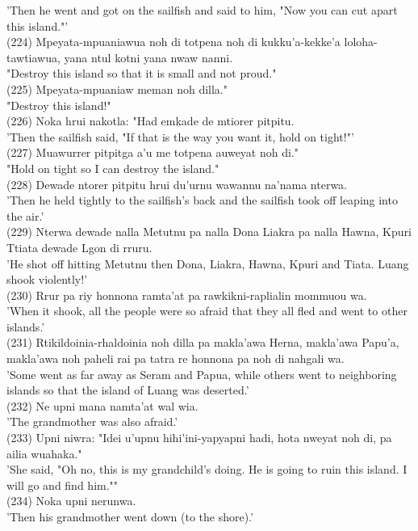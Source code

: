 \documentclass[10pt]{article}
\begin{document}
'Then he went and got on the sailfish and said to him, "Now you can cut apart this island."'\\
(224) Mpeyata-mpuaniawua noh di totpena noh di kukku'a-kekke'a loloha-tawtiawua, yana ntul kotni yana nwaw nanni.\\
"Destroy this island so that it is small and not proud."\\
(225) Mpeyata-mpuaniaw meman noh dilla."\\
"Destroy this island!"\\
(226) Noka hrui nakotla: "Had emkade de mtiorer pitpitu.\\
'Then the sailfish said, "If that is the way you want it, hold on tight!"'\\
(227) Muawurrer pitpitga a'u me totpena auweyat noh di."\\
"Hold on tight so I can destroy the island."\\
(228) Dewade ntorer pitpitu hrui du'urnu wawannu na'nama nterwa.\\
'Then he held tightly to the sailfish's back and the sailfish took off leaping into the air.'\\
(229) Nterwa dewade nalla Metutnu pa nalla Dona Liakra pa nalla Hawna, Kpuri Ttiata dewade Lgon di rruru.\\
'He shot off hitting Metutnu then Dona, Liakra, Hawna, Kpuri and Tiata. Luang shook violently!'\\
(230) Rrur pa riy honnona ramta'at pa rawkikni-raplialin mommuou wa.\\
'When it shook, all the people were so afraid that they all fled and went to other islands.'\\
(231) Rtikildoinia-rhaldoinia noh dilla pa makla'awa Herna, makla'awa Papu'a, makla'awa noh paheli rai pa tatra re honnona pa noh di nahgali wa.\\
'Some went as far away as Seram and Papua, while others went to neighboring islands so that the island of Luang was deserted.'\\
(232) Ne upni mana namta'at wal wia.\\
'The grandmother was also afraid.'\\
(233) Upni niwra: "Idei u'upnu hihi'ini-yapyapni hadi, hota nweyat noh di, pa ailia wuahaka."\\
'She said, "Oh no, this is my grandchild's doing. He is going to ruin this island. I will go and find him.""\\
(234) Noka upni nerunwa.\\
'Then his grandmother went down (to the shore).'\\
\end{document}

